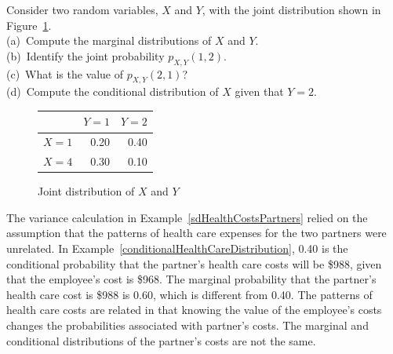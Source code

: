 \begin{exercisewrap}
\begin{nexercise}
Consider two random variables, $X$ and $Y$, with the joint distribution shown in Figure~\ref{table:jointDistGuidedPractice}. \\
(a)~Compute the marginal distributions of $X$ and $Y$. \\
(b)~Identify the joint probability $p_{X,Y}(1, 2)$. \\
(c)~What is the value of $p_{X, Y}(2, 1)$? \\
(d)~Compute the conditional distribution of $X$ given that $Y = 2$.\footnotemark{}
\end{nexercise}
\end{exercisewrap}

\begin{figure}[h]
	\centering
	\small
	\begin{tabular}{r|rr}
		\hline
		& $Y = 1$ & $Y = 2$ \\ 
		\hline
		$X = 1$  & 0.20 & 0.40 \\ 
		$X = 4$ & 0.30 & 0.10 \\ 
		\hline
	\end{tabular}
	\caption{Joint distribution of $X$ and $Y$} 
	\label{table:jointDistGuidedPractice}
\end{figure}

The variance calculation in Example~\ref{sdHealthCostsPartners} relied on the assumption that the patterns of health care expenses for the two partners were unrelated. In Example~\ref{conditionalHealthCareDistribution}, 0.40 is the conditional probability that the partner's health care costs will be \$988, given that the employee's cost is \$968.  The marginal probability that the partner's health care cost is \$988 is 0.60, which is different from 0.40.  The patterns of health care costs are related in that knowing the value of the employee's costs changes the probabilities associated with partner's costs.  The marginal and conditional distributions of the partner's costs are not the same.

